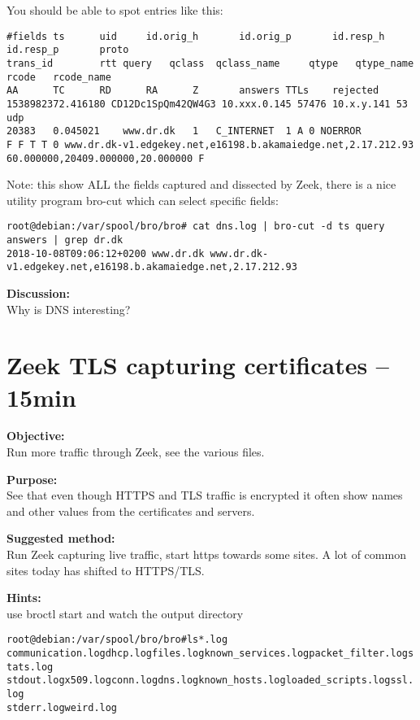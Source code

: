 \documentclass[a4paper,11pt,notitlepage]{report}
\begin{document}
You should be able to spot entries like this:
\begin{verbatim}
#fields ts      uid     id.orig_h       id.orig_p       id.resp_h       id.resp_p       proto
trans_id        rtt query   qclass  qclass_name     qtype   qtype_name      rcode   rcode_name
AA      TC      RD      RA      Z       answers TTLs    rejected
1538982372.416180 CD12Dc1SpQm42QW4G3 10.xxx.0.145 57476 10.x.y.141 53	udp
20383	0.045021	www.dr.dk	1	C_INTERNET	1 A 0 NOERROR
F F T T 0 www.dr.dk-v1.edgekey.net,e16198.b.akamaiedge.net,2.17.212.93 60.000000,20409.000000,20.000000 F
\end{verbatim}

Note: this show ALL the fields captured and dissected by Zeek, there is a nice utility program bro-cut which can select specific fields:

\begin{verbatim}
root@debian:/var/spool/bro/bro# cat dns.log | bro-cut -d ts query answers | grep dr.dk
2018-10-08T09:06:12+0200 www.dr.dk www.dr.dk-v1.edgekey.net,e16198.b.akamaiedge.net,2.17.212.93
\end{verbatim}

{\bf Discussion:}\\
Why is DNS interesting?


\chapter{Zeek TLS capturing certificates -- 15min}
\label{ex:zeektlsbasic}


{\bf Objective:} \\
Run more traffic through Zeek, see the various files.


{\bf Purpose:}\\
See that even though HTTPS and TLS traffic is encrypted it often show names and other values from the certificates and servers.


{\bf Suggested method:}\\
Run Zeek capturing live traffic, start https towards some sites. A lot of common sites today has shifted to HTTPS/TLS.


{\bf Hints:}\\
use broctl start and watch the output directory

\begin{alltt}\small
root@debian:/var/spool/bro/bro# ls *.log
communication.log  dhcp.log files.log known_services.log packet_filter.log  stats.log
stdout.log x509.log conn.log dns.log known_hosts.log loaded_scripts.log  ssl.log
stderr.log weird.log
\end{alltt}
\end{document}
